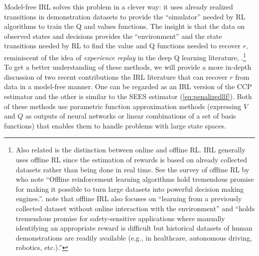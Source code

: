 Model-free IRL solves this problem in a clever way: it uses already realized transitions in demonstration datasets to provide the
``simulator'' needed by RL algorithms  to train the Q and values functions.
The insight is that the data on observed states and decisions provides the  ``environment'' and the state transitions needed
by RL to find  the value and Q functions needed to recover $r$, reminiscent of the idea
of {\it experience replay\/} in the deep Q learning literature, \citet{mnih:2015}.\footnote{\footnotesize Also related is the
distinction between online and offline RL. IRL generally uses offline RL since the estimation of rewards is based
on already collected datasets rather than being done in real time.  See the survey of offline RL by
 \citet{offlinerl:2020} who note ``Offline reinforcement learning algorithms hold tremendous promise for making it possible to turn large datasets into powerful decision making engines.''.  \citet{clare:2023} note that offline IRL also focuses on 
``learning from a previously collected dataset without online interaction with the environment'' 
and ``holds tremendous promise for safety-sensitive applications where manually identifying an appropriate reward 
is difficult but historical datasets of human demonstrations are readily available (e.g., in healthcare, autonomous driving, robotics, etc.).''}
To get a better understanding of these methods, we will provide a more in-depth discussion of two recent contributions the IRL literature
that can recover $r$ from data in a model-free manner. One can be regarded as an IRL version of the CCP estimator and
the other is similar to the SEES estimator (\ref{eq:penalizedllf}).  Both of these
methods use parametric function approximation methods (expressing $V$ and $Q$ as outputs of neural networks or
linear combinations of a set of basis functions) that enables them to handle problems with large 
state spaces.


